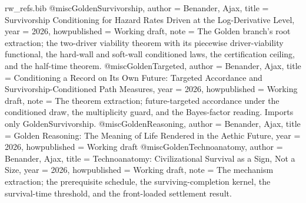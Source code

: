 \begin{filecontents}[overwrite]{rw_refs.bib}
@misc{GoldenSurvivorship,
  author       = {Benander, Ajax},
  title        = {Survivorship Conditioning for Hazard Rates Driven at the Log-Derivative Level},
  year         = {2026},
  howpublished = {Working draft},
  note         = {The Golden branch's root extraction; the two-driver viability
                  theorem with its piecewise driver-viability functional, the
                  hard-wall and soft-wall conditioned laws, the certification
                  ceiling, and the half-time theorem.}
}
@misc{GoldenTargeted,
  author       = {Benander, Ajax},
  title        = {Conditioning a Record on Its Own Future: Targeted Accordance and Survivorship-Conditioned Path Measures},
  year         = {2026},
  howpublished = {Working draft},
  note         = {The theorem extraction; future-targeted accordance under the
                  conditioned draw, the multiplicity guard, and the Bayes-factor
                  reading. Imports only GoldenSurvivorship.}
}
@misc{GoldenReasoning,
  author       = {Benander, Ajax},
  title        = {Golden Reasoning: The Meaning of Life Rendered in the Aethic Future},
  year         = {2026},
  howpublished = {Working draft}
}
@misc{GoldenTechnoanatomy,
  author       = {Benander, Ajax},
  title        = {Technoanatomy: Civilizational Survival as a Sign, Not a Size},
  year         = {2026},
  howpublished = {Working draft},
  note         = {The mechanism extraction; the prerequisite schedule, the
                  surviving-completion kernel, the survival-time threshold, and the
                  front-loaded settlement result.}
}


\end{filecontents}
